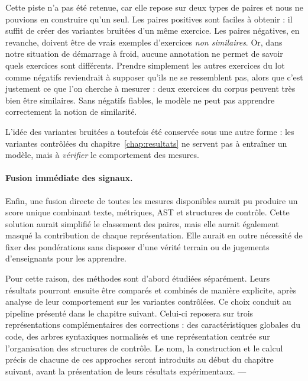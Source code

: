 \documentclass[12pt,a4paper,oneside]{report}
\begin{document}
Cette piste n'a pas été retenue, car elle repose sur deux types de paires
et nous ne pouvions en construire qu'un seul. Les paires positives sont faciles
à obtenir : il suffit de créer des variantes bruitées d'un même exercice.
Les paires négatives, en revanche, doivent être de vrais exemples
d'exercices \emph{non similaires}. Or, dans notre situation de démarrage à
froid, aucune annotation ne permet de savoir quels exercices sont différents.
Prendre simplement les autres exercices du lot comme négatifs reviendrait à
supposer qu'ils ne se ressemblent pas, alors que c'est justement ce que l'on
cherche à mesurer : deux exercices du corpus peuvent très bien être
similaires. Sans négatifs fiables, le modèle ne peut pas apprendre
correctement la notion de similarité.

L'idée des variantes bruitées a toutefois été conservée sous une autre
forme : les variantes contrôlées du chapitre~\ref{chap:resultats} ne servent
pas à entraîner un modèle, mais à \emph{vérifier} le comportement des mesures.

\paragraph{Fusion immédiate des signaux.}

Enfin, une fusion directe de toutes les mesures disponibles aurait pu produire
un score unique combinant texte, métriques, AST et structures de contrôle.
Cette solution aurait simplifié le classement des paires, mais elle aurait
également masqué la contribution de chaque représentation. Elle aurait en
outre nécessité de fixer des pondérations sans disposer d'une vérité terrain
ou de jugements d'enseignants pour les apprendre.

Pour cette raison, des méthodes sont d'abord étudiées séparément. Leurs
résultats pourront ensuite être comparés et combinés de manière explicite,
après analyse de leur comportement sur les variantes contrôlées. Ce choix
conduit au pipeline présenté dans le chapitre suivant. Celui-ci reposera sur
trois représentations complémentaires des corrections : des caractéristiques
globales du code, des arbres syntaxiques normalisés et une représentation
centrée sur l'organisation des structures de contrôle. Le nom, la construction
et le calcul précis de chacune de ces approches seront introduits au début du
chapitre suivant, avant la présentation de leurs résultats expérimentaux.
---


\end{document}
